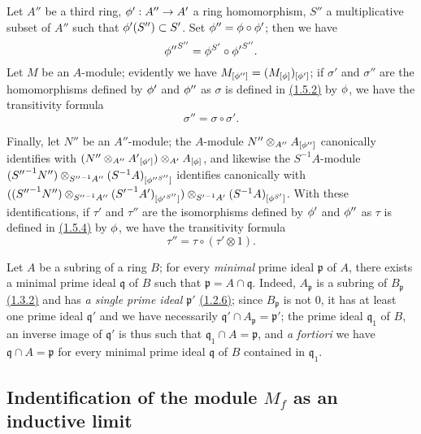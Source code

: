 \begin{env}[1.5.7]
\label{env-0.1.5.7}
Let $A''$ be a third ring, $\phi':A''\to A'$ a ring homomorphism, $S''$ a
multiplicative subset of $A''$ such that $\phi'(S'')\subset S'$. Set
$\phi''=\phi\circ\phi'$; then we have
\[
  {\phi''}^{S''}=\phi^{S'}\circ{\phi'}^{S''}.
\]
Let $M$ be an $A$-module; evidently we have
$M_{[\phi'']}=(M_{[\phi]})_{[\phi']}$; if $\sigma'$ and $\sigma''$ are the
homomorphisms defined by $\phi'$ and $\phi''$ as $\sigma$ is defined in
\hyperref[env-0.1.5.2]{(1.5.2)} by $\phi$, we have the transitivity formula
\[
  \sigma''=\sigma\circ\sigma'.
\]

Finally, let $N''$ be an $A''$-module; the $A$-module
$N''\otimes_{A''}A_{[\phi'']}$ canonically identifies with
$(N''\otimes_{A''}{A'}_{[\phi']})\otimes_{A'}A_{[\phi]}$, and likewise the
$S^{-1}A$-module
$({S''}^{-1}N'')\otimes_{{S''}^{-1}A''}(S^{-1}A)_{[{\phi''}^{S''}]}$ identifies
canonically with
$(({S''}^{-1}N'')\otimes_{{S''}^{-1}A''}({S'}^{-1}A')_{[{\phi'}^{S''}]})
  \otimes_{{S'}^{-1}A'}(S^{-1}A)_{[\phi^{S'}]}$. With these identifications, if
$\tau'$ and $\tau''$ are the isomorphisms defined by $\phi'$ and $\phi''$ as
$\tau$ is defined in \hyperref[env-0.1.5.4]{(1.5.4)} by $\phi$, we have the transitivity
formula
\[
  \tau''=\tau\circ(\tau'\otimes 1).
\]
\end{env}

\begin{env}[1.5.8]
\label{env-0.1.5.8}
Let $A$ be a subring of a ring $B$; for every {\em minimal} prime ideal
$\mathfrak{p}$ of $A$, there exists a minimal prime ideal $\mathfrak{q}$ of $B$
such that $\mathfrak{p}=A\cap\mathfrak{q}$. Indeed, $A_\mathfrak{p}$ is a
subring of $B_\mathfrak{p}$ \hyperref[env-0.1.3.2]{(1.3.2)} and has {\em a single prime
ideal $\mathfrak{p}'$} \hyperref[env-0.1.2.6]{(1.2.6)}; since $B_\mathfrak{p}$ is not
$0$, it has at least one prime ideal $\mathfrak{q}'$ and we have necessarily
$\mathfrak{q}'\cap A_\mathfrak{p}=\mathfrak{p}'$; the prime ideal
$\mathfrak{q}_1$ of $B$, an inverse image of $\mathfrak{q}'$ is thus such that
$\mathfrak{q}_1\cap A=\mathfrak{p}$, and {\em a fortiori} we have
$\mathfrak{q}\cap A=\mathfrak{p}$ for every minimal prime ideal $\mathfrak{q}$
of $B$ contained in $\mathfrak{q}_1$.
\end{env}

\subsection{Indentification of the module $M_f$ as an inductive limit}
\label{subsection-localization-as-inductive-limit}

